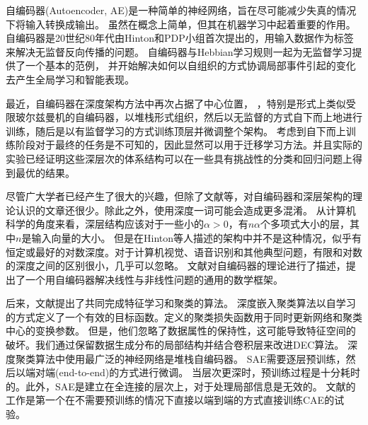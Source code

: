 自编码器(Autoencoder, AE)是一种简单的神经网络，旨在尽可能减少失真的情况下将输入转换成输出。
虽然在概念上简单，但其在机器学习中起着重要的作用。
自编码器是20世纪80年代由Hinton和PDP小组\cite{rumelhart1985learning}首次提出的，用输入数据作为标签来解决无监督反向传播的问题。
自编码器与Hebbian学习规则\cite{hebb2005organization}一起为无监督学习提供了一个基本的范例，
并开始解决如何以自组织的方式协调局部事件引起的变化去产生全局学习和智能表现。%

最近，自编码器在深度架构方法\cite{hinton2006reducing,hinton2006fast,bengio2007scaling,erhan2010does}中再次占据了中心位置，
，特别是形式上类似受限玻尔兹曼机的自编码器，以堆栈形式组织，然后以无监督的方式自下而上地进行训练，随后是以有监督学习的方式训练顶层并微调整个架构。
考虑到自下而上训练阶段对于最终的任务是不可知的，因此显然可以用于迁移学习方法。并且实际的实验已经证明这些深层次的体系结构可以在一些具有挑战性的分类和回归问题上得到最优的结果。

尽管广大学者已经产生了很大的兴趣，但除了文献\cite{montufar2011refinements,sutskever2008deep,baldi1989neural}等，对自编码器和深层架构的理论认识的文章还很少。除此之外，使用深度一词可能会造成更多混淆。
从计算机科学的角度来看，深层结构应该对于一些小的$\alpha> 0，$有$n\alpha$个多项式大小的层，其中$n$是输入向量的大小\cite{clote2013boolean}。
但是在Hinton等人\cite{hinton2006reducing,hinton2006fast}描述的架构中并不是这种情况，似乎有恒定或最好的对数深度。对于计算机视觉、语音识别和其他典型问题，有限和对数的深度之间的区别很小，几乎可以忽略。
文献\cite{baldi2012autoencoders}对自编码器的理论进行了描述，提出了一个用自编码器解决线性与非线性问题的通用的数学框架。

后来，文献\cite{xie2016unsupervised}提出了共同完成特征学习和聚类的算法。
深度嵌入聚类算法\cite{xie2016unsupervised}以自学习的方式定义了一个有效的目标函数。定义的聚类损失函数用于同时更新网络和聚类中心的变换参数。
但是，他们忽略了数据属性的保持性，这可能导致特征空间的破坏。我们通过保留数据生成分布的局部结构并结合卷积层来改进DEC算法。%
深度聚类算法中使用最广泛的神经网络是堆栈自编码器\cite{xie2016unsupervised}。
SAE需要逐层预训练，然后以端对端(end-to-end)的方式进行微调。
当层次更深时，预训练过程是十分耗时的。此外，SAE是建立在全连接的层次上，对于处理局部信息是无效的。
文献\cite{dundar2015convolutional}的工作是第一个在不需要预训练的情况下直接以端到端的方式直接训练CAE的试验。

